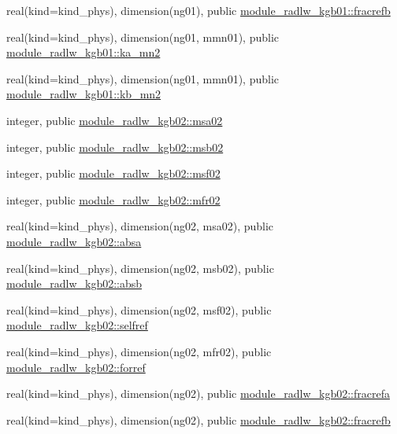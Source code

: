 \begin{DoxyCompactItemize}
\item 
real(kind=kind\+\_\+phys), dimension(ng01), public \hyperlink{namespacemodule__radlw__kgb01_a19b6a3893965817e82c77bee1de536cd}{module\+\_\+radlw\+\_\+kgb01\+::fracrefb}
\item 
real(kind=kind\+\_\+phys), dimension(ng01, mmn01), public \hyperlink{namespacemodule__radlw__kgb01_a0a4f08c625f2f25f132200811af42331}{module\+\_\+radlw\+\_\+kgb01\+::ka\+\_\+mn2}
\item 
real(kind=kind\+\_\+phys), dimension(ng01, mmn01), public \hyperlink{namespacemodule__radlw__kgb01_ac357df5f66a7e384e22db58203ac294a}{module\+\_\+radlw\+\_\+kgb01\+::kb\+\_\+mn2}
\item 
integer, public \hyperlink{namespacemodule__radlw__kgb02_a370b514d7834ac2a22d245f118882bf4}{module\+\_\+radlw\+\_\+kgb02\+::msa02}
\item 
integer, public \hyperlink{namespacemodule__radlw__kgb02_a03e70b84fd16795104a3fb7b425af70c}{module\+\_\+radlw\+\_\+kgb02\+::msb02}
\item 
integer, public \hyperlink{namespacemodule__radlw__kgb02_a99b728d38d664afc203303563541ab5c}{module\+\_\+radlw\+\_\+kgb02\+::msf02}
\item 
integer, public \hyperlink{namespacemodule__radlw__kgb02_a2973c2e9220e85b74f0b251c896aa837}{module\+\_\+radlw\+\_\+kgb02\+::mfr02}
\item 
real(kind=kind\+\_\+phys), dimension(ng02, msa02), public \hyperlink{namespacemodule__radlw__kgb02_a46db893d4456b2d867130bb208cb2206}{module\+\_\+radlw\+\_\+kgb02\+::absa}
\item 
real(kind=kind\+\_\+phys), dimension(ng02, msb02), public \hyperlink{namespacemodule__radlw__kgb02_acf34f9255586c9ed5ac5370db5b63c14}{module\+\_\+radlw\+\_\+kgb02\+::absb}
\item 
real(kind=kind\+\_\+phys), dimension(ng02, msf02), public \hyperlink{namespacemodule__radlw__kgb02_addb071e93b4ff49ba1f1c4d102e275f1}{module\+\_\+radlw\+\_\+kgb02\+::selfref}
\item 
real(kind=kind\+\_\+phys), dimension(ng02, mfr02), public \hyperlink{namespacemodule__radlw__kgb02_af6f3d7a0ab6858eab9d4d3e2d2d68031}{module\+\_\+radlw\+\_\+kgb02\+::forref}
\item 
real(kind=kind\+\_\+phys), dimension(ng02), public \hyperlink{namespacemodule__radlw__kgb02_af6db1580bd4a8b037cdd3e14765e2c83}{module\+\_\+radlw\+\_\+kgb02\+::fracrefa}
\item 
real(kind=kind\+\_\+phys), dimension(ng02), public \hyperlink{namespacemodule__radlw__kgb02_aeedda30c8d2bd7c9e7124c6445c8c20e}{module\+\_\+radlw\+\_\+kgb02\+::fracrefb}

\end{DoxyCompactItemize}
